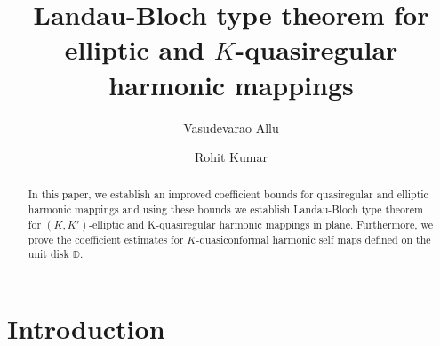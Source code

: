 \documentclass[a4paper,12pt]{amsart}
\theoremstyle{plain}
\theoremstyle{definition}
\newcounter{minutes}\setcounter{minutes}{\time}
\newcounter{hours}\setcounter{hours}{\time}
\begin{document}
\title{Landau-Bloch type theorem for elliptic and $K$-quasiregular harmonic mappings}


\author{Vasudevarao Allu}
\address{Vasudevarao Allu,
	School of Basic Science,
	Indian Institute of Technology Bhubaneswar,
	Bhubaneswar-752050, Odisha, India.}

\author{Rohit Kumar}
\address{Rohit Kumar,
	School of Basic Science,
	Indian Institute of Technology Bhubaneswar,
	Bhubaneswar-752050, Odisha, India.}






\def\thefootnote{}
 \makeatletter\def\thefootnote{\@arabic\c@footnote}\makeatother



\begin{abstract}
 In this paper, we establish an improved coefficient bounds for quasiregular and elliptic harmonic mappings and 
 using these bounds we establish Landau-Bloch type theorem for $(K,K')$-elliptic and K-quasiregular harmonic 
 mappings in plane. Furthermore, we prove the coefficient estimates for $K$-quasiconformal harmonic self maps defined on the unit disk $\mathbb{D}$.
\end{abstract}



\maketitle
\pagestyle{myheadings}

\section{\textbf{Introduction}}
\end{document}
